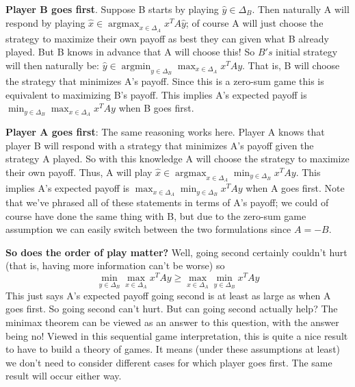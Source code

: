 \documentclass[12pt]{article}
\DeclareMathOperator*{\argmax}{argmax}
\DeclareMathOperator*{\argmin}{argmin}
\begin{document}
\textbf{Player B goes first}. Suppose B starts by playing $\hat{y} \in \Delta_B$. Then naturally A will respond by playing $\hat{x} \in \argmax_{x \in \Delta_A} x^T A \hat{y}$; of course A will just 
choose the strategy to maximize their own payoff as best they can given what B already played. But B knows in advance that A will choose this! 
So $B's$ initial strategy will then naturally be: $\hat{y} \in \argmin_{y \in \Delta_B} \max_{x \in \Delta_A} x^T A y$. That is, B will choose the strategy that minimizes A's payoff. Since this is 
a zero-sum game this is equivalent to maximizing B's payoff. This implies A's expected payoff is $\min_{y \in \Delta_B} \max_{x \in \Delta_A} x^T A y$ when B goes first. 

\bigskip

\textbf{Player A goes first}: The same reasoning works here. Player A knows that player B will respond with a strategy that minimizes A's payoff given the strategy A played. So with this knowledge
A will choose the strategy to maximize their own payoff. Thus, A will 
play $\hat{x} \in \argmax_{x \in \Delta_A} \min_{y \in \Delta_B} x^T A y$. This implies A's expected payoff is $\max_{x \in \Delta_A} \min_{y \in \Delta_B} x^T A y$ when A goes first. 
Note that we've phrased all of these statements in terms of A's payoff; we could of course have done the same thing with B, 
but due to the zero-sum game assumption we can easily switch between the two formulations since $A = -B$. 

\bigskip

\textbf{So does the order of play matter?} Well, going second certainly couldn't hurt (that is, having more information can't be worse) so
\[\min_{y \in \Delta_B} \max_{x \in \Delta_A} x^T A y \geq \max_{x \in \Delta_A} \min_{y \in \Delta_B} x^T A y\]
This just says A's expected payoff going second is at least as large as when A goes first. So going second can't hurt. But can going second actually help? The minimax theorem can be viewed
as an answer to this question, with the answer being no! Viewed in this sequential game interpretation, this is quite a nice result to have to build a theory of games. It means (under these assumptions 
at least) we don't need to consider different cases for which player goes first. The same result will occur either way. 
\end{document}
